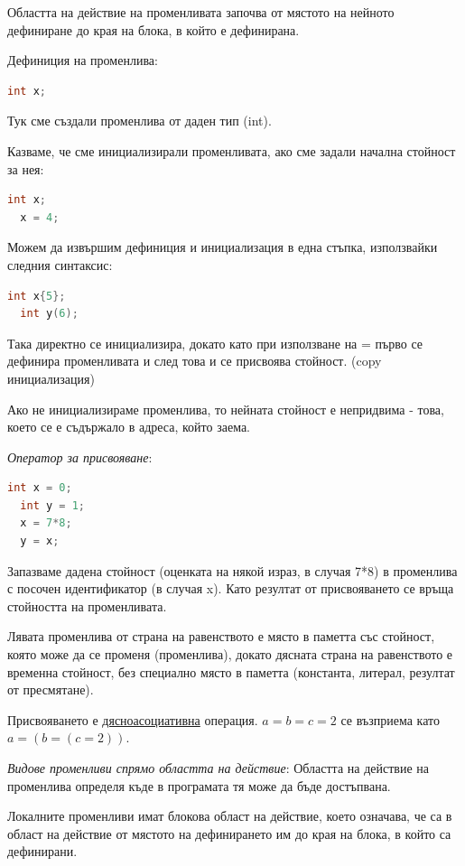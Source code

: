\documentclass{article}
\renewcommand{\\}{\newline}
\begin{document}
Областта на действие на променливата започва от мястото на нейното дефиниране до края на блока, в който е дефинирана.

Дефиниция на променлива: 
\begin{lstlisting}[language=C++]
  int x;
\end{lstlisting}

Тук сме създали променлива от даден тип (int).

Казваме, че сме инициализирали променливата, ако сме задали начална стойност за нея:
\begin{lstlisting}[language=C++]
  int x;
  x = 4;
\end{lstlisting}

Можем да извършим дефиниция и инициализация в една стъпка, използвайки следния синтаксис:
\begin{lstlisting}[language=C++]
  int x{5};
  int y(6);
\end{lstlisting}

Така директно се инициализира, докато като при използване на = първо се дефинира променливата и след това и се присвоява стойност. (copy инициализация)

Ако не инициализираме променлива, то нейната стойност е непридвима - това, което се е съдържало в адреса, който заема.

\textit{Оператор за присвояване}: 
\begin{lstlisting}[language=C++]
  int x = 0;
  int y = 1;
  x = 7*8;
  y = x;
\end{lstlisting}

Запазваме дадена стойност (оценката на някой израз, в случая 7*8) в променлива с посочен идентификатор (в случая x). Като резултат от присвояването се връща стойността на променливата.

Лявата променлива от страна на равенството е място в паметта със стойност, която може да се променя (променлива), докато дясната страна на равенството е временна стойност, без специално място в паметта (константа, литерал, резултат от пресмятане). 

Присвояването е \underline{дясноасоциативна} операция. \(a = b = c = 2\) се възприема като \(a = (b = (c = 2))\).

\textit{Видове променливи спрямо областта на действие}: Областта на действие на променлива определя къде в програмата тя може да бъде достъпвана.

Локалните променливи имат блокова област на действие, което означава, че са в област на действие от мястото на дефинирането им до края на блока, в който са дефинирани.
\end{document}
